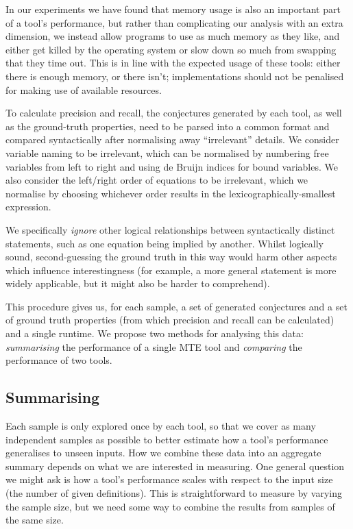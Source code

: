 In our experiments we have found that memory usage is also an important part of
a tool's performance, but rather than complicating our analysis with an extra
dimension, we instead allow programs to use as much memory as they like, and
either get killed by the operating system or slow down so much from swapping
that they time out. This is in line with the expected usage of these tools:
either there is enough memory, or there isn't; implementations should not be
penalised for making use of available resources.

To calculate precision and recall, the conjectures generated by each tool, as
well as the ground-truth properties, need to be parsed into a common format and
compared syntactically after normalising away ``irrelevant'' details. We
consider variable naming to be irrelevant, which can be normalised by numbering
free variables from left to right and using de Bruijn indices for bound
variables. We also consider the left/right order of equations to be irrelevant,
which we normalise by choosing whichever order results in the
lexicographically-smallest expression.

We specifically \emph{ignore} other logical relationships between syntactically
distinct statements, such as one equation being implied by another. Whilst
logically sound, second-guessing the ground truth in this way would harm other
aspects which influence interestingness (for example, a more general statement
is more widely applicable, but it might also be harder to comprehend).

This procedure gives us, for each sample, a set of generated conjectures and a
set of ground truth properties (from which precision and recall can be
calculated) and a single runtime. We propose two methods for analysing this
data: \emph{summarising} the performance of a single MTE tool and
\emph{comparing} the performance of two tools.

\subsection{Summarising}

Each sample is only explored once by each tool, so that we cover as many
independent samples as possible to better estimate how a tool's performance
generalises to unseen inputs. How we combine these data into an aggregate
summary depends on what we are interested in measuring. One general question we
might ask is how a tool's performance scales with respect to the input size (the
number of given definitions). This is straightforward to measure by varying the
sample size, but we need some way to combine the results from samples of the
same size.

